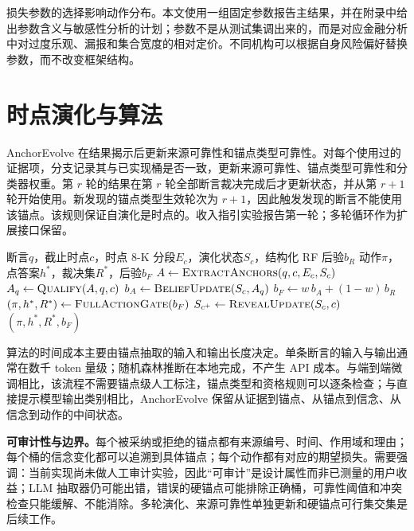 损失参数的选择影响动作分布。本文使用一组固定参数报告主结果，并在附录中给出参数含义与敏感性分析的计划；参数不是从测试集调出来的，而是对应金融分析中对过度乐观、漏报和集合宽度的相对定价。不同机构可以根据自身风险偏好替换参数，而不改变框架结构。

\section{时点演化与算法}

AnchorEvolve 在结果揭示后更新来源可靠性和锚点类型可靠性。对每个使用过的证据项，分支记录其与已实现桶是否一致，更新来源可靠性、锚点类型可靠性和分类器权重。第 $r$ 轮的结果在第 $r$ 轮全部断言裁决完成后才更新状态，并从第 $r+1$ 轮开始使用。新发现的锚点类型生效轮次为 $r+1$，因此触发发现的断言不能使用该锚点。该规则保证自演化是时点的。收入指引实验报告第一轮；多轮循环作为扩展接口保留。

\begin{algorithm}[H]
\caption{AnchorEvolve 单条断言的演化与全动作裁决}
\label{alg:anchor}
\begin{algorithmic}[1]
\Require 断言$q$，截止时点$c$，时点 8-K 分段$E_c$，演化状态$S_c$，结构化 RF 后验$b_R$
\Ensure 动作$\pi$，点答案$h^\ast$，裁决集$R^\ast$，后验$b_F$
\State $A\gets\textsc{ExtractAnchors}(q,c,E_c,S_c)$
\State $A_q\gets\textsc{Qualify}(A,q,c)$ 
\State $b_A\gets\textsc{BeliefUpdate}(S_c,A_q)$
\State $b_F\gets w\,b_A+(1-w)\,b_R$
\State $(\pi,h^\ast,R^\ast)\gets\textsc{FullActionGate}(b_F)$
\State $S_{c^+}\gets\textsc{RevealUpdate}(S_c,c)$ 
\State \Return $(\pi,h^\ast,R^\ast,b_F)$
\end{algorithmic}
\end{algorithm}

算法的时间成本主要由锚点抽取的输入和输出长度决定。单条断言的输入与输出通常在数千 token 量级；随机森林推断在本地完成，不产生 API 成本。与端到端微调相比，该流程不需要锚点级人工标注，锚点类型和资格规则可以逐条检查；与直接提示模型输出类别相比，AnchorEvolve 保留从证据到锚点、从锚点到信念、从信念到动作的中间状态。

\begin{revbox}
\noindent\textbf{可审计性与边界。}每个被采纳或拒绝的锚点都有来源编号、时间、作用域和理由；每个桶的信念变化都可以追溯到具体锚点；每个动作都有对应的期望损失。需要强调：当前实现尚未做人工审计实验，因此“可审计”是设计属性而非已测量的用户收益；LLM 抽取器仍可能出错，错误的硬锚点可能排除正确桶，可靠性阈值和冲突检查只能缓解、不能消除。多轮演化、来源可靠性单独更新和硬锚点可行集交集是后续工作。
\end{revbox}
